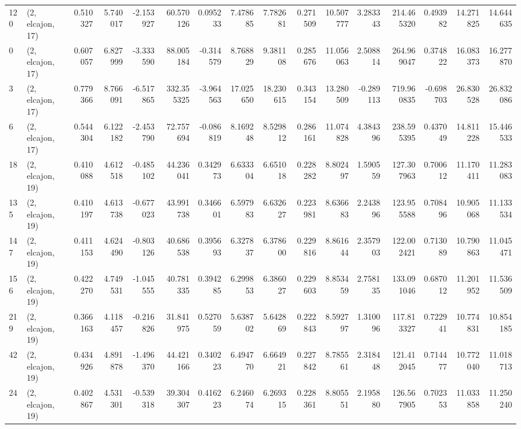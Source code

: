 \begin{tabular}{llrrrrrrrrrrrrrr}
120 &  (2, elcajon, 17) &   0.510327 &   5.740017 & -2.153927 &   60.570126 &  0.095233 &   7.478685 &   7.782681 &  0.271509 &  10.507777 &   3.283343 &  214.465320 &  0.493982 &  14.271825 &  14.644635 \\
0   &  (2, elcajon, 17) &   0.607057 &   6.827999 & -3.333590 &   88.005184 & -0.314579 &   8.768829 &   9.381108 &  0.285676 &  11.056063 &   2.508814 &  264.969047 &  0.374822 &  16.083373 &  16.277870 \\
3   &  (2, elcajon, 17) &   0.779366 &   8.766091 & -6.517865 &  332.355325 & -3.964563 &  17.025650 &  18.230615 &  0.343154 &  13.280509 &  -0.289113 &  719.960835 & -0.698703 &  26.830528 &  26.832086 \\
6   &  (2, elcajon, 17) &   0.544304 &   6.122182 & -2.453790 &   72.757694 & -0.086819 &   8.169248 &   8.529812 &  0.286161 &  11.074828 &   4.384396 &  238.595395 &  0.437049 &  14.811228 &  15.446533 \\
18  &  (2, elcajon, 19) &   0.410088 &   4.612518 & -0.485102 &   44.236041 &  0.342973 &   6.633304 &   6.651018 &  0.228282 &   8.802497 &   1.590559 &  127.307963 &  0.700612 &  11.170411 &  11.283083 \\
135 &  (2, elcajon, 19) &   0.410197 &   4.613738 & -0.677023 &   43.991738 &  0.346601 &   6.597983 &   6.632627 &  0.223981 &   8.636683 &   2.243896 &  123.955588 &  0.708496 &  10.905068 &  11.133534 \\
147 &  (2, elcajon, 19) &   0.411153 &   4.624490 & -0.803126 &   40.686538 &  0.395693 &   6.327837 &   6.378600 &  0.229816 &   8.861644 &   2.357903 &  122.002421 &  0.713089 &  10.790863 &  11.045471 \\
156 &  (2, elcajon, 19) &   0.422270 &   4.749531 & -1.045555 &   40.781335 &  0.394285 &   6.299853 &   6.386027 &  0.229603 &   8.853459 &   2.758135 &  133.091046 &  0.687012 &  11.201952 &  11.536509 \\
219 &  (2, elcajon, 19) &   0.366163 &   4.118457 & -0.216826 &   31.841975 &  0.527059 &   5.638702 &   5.642869 &  0.222843 &   8.592797 &   1.310096 &  117.813327 &  0.722941 &  10.774831 &  10.854185 \\
42  &  (2, elcajon, 19) &   0.434926 &   4.891878 & -1.496370 &   44.421166 &  0.340223 &   6.494770 &   6.664921 &  0.227842 &   8.785561 &   2.318448 &  121.412045 &  0.714477 &  10.772040 &  11.018713 \\
24  &  (2, elcajon, 19) &   0.402867 &   4.531301 & -0.539318 &   39.304307 &  0.416223 &   6.246074 &   6.269315 &  0.228361 &   8.805551 &   2.195880 &  126.567905 &  0.702353 &  11.033858 &  11.250240 \\

\end{tabular}
